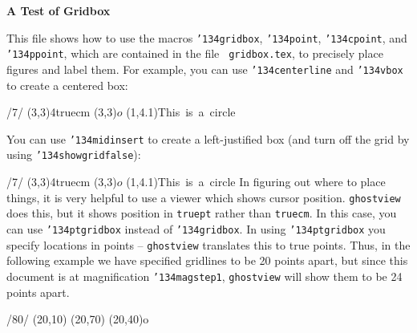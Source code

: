 \magnification{}
\hsize 4.66in
\vsize 7.66in
\def\tb#1{{\tt \char'134#1}}



\centerline{\bf A Test of Gridbox}
\bigskip
This file shows how to use the macros \tb{gridbox}, \tb{point},
\tb{cpoint}, and \tb{ppoint}, which are contained in the file {\tt
gridbox.tex}, to precisely place figures and label them.
For example, you can use \tb{centerline} and \tb{vbox}
to create a centered box:
\bigskip

\centerline{\vbox{
/7/{
\cpoint(3,3){\epsfxsize4truecm}
(3,3){$o$}
\point(1,4.1){\hbox{This is a circle}}
}}}

\bigskip
You can use \tb{midinsert} to create a left-justified box (and turn off the
grid
by using \tb{showgridfalse}):

\midinsert
\showgridfalse
{}/7/{
(3,3){\epsfxsize4truecm}
\cpoint(3,3){$o$}
(1,4.1){\hbox{This is a circle}}
}
\endinsert
In figuring out where to place things, it is very helpful to
use a viewer which shows cursor position.
{\tt ghostview} does this, but it shows position in
{\tt truept} rather than {\tt truecm}.  In this case,
you can use \tb{ptgridbox} instead of \tb{gridbox}. In using
\tb{ptgridbox} you specify locations in points -- {\tt ghostview}
translates this to true points. Thus,
in the following example we have specified
gridlines to be 20 points apart, but since
this document is at magnification  \tb{magstep1},
{\tt ghostview} will show them to be 24 points apart.
\smallskip

\centerline{\vbox{/80/{
(20,10){}
(20,70){}
\cpoint(20,40){o}
}}}
\bye

